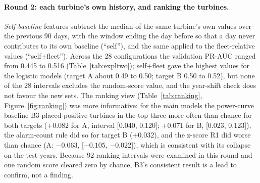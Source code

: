 \documentclass[12pt,a4paper]{article}
\begin{document}
	\begin{table}[htbp]
	\centering
	\footnotesize
	
	\caption{Round 1, validation PR-AUC. Raw: features as in the main models; Fleet: sensor features minus the same-day fleet median; Fleet+season: also minus the training-year month-of-year mean. Random-score value: 0.465 (A) and 0.483 (B).}
	\label{tab:explval}
	\end{table}

	\begin{table}[htbp]
	\centering
	\footnotesize
	
	\caption{Round 1, year-shift check on training years only: PR-AUC on 2020 for models fitted on days up to 2018. The prevalence of 2020 is 0.412 (A) and 0.399 (B).}
	\label{tab:explshift}
	\end{table}

	\paragraph{Round 2: each turbine's own history, and ranking the turbines.} \emph{Self-baseline} features subtract the median of the same turbine's own values over the previous 90 days, with the window ending the day before so that a day never contributes to its own baseline (``self''), and the same applied to the fleet-relative values (``self+fleet''). Across the 28 configurations the validation PR-AUC ranged from 0.445 to 0.516 (Table~\ref{tab:expltwo}); self+fleet gave the highest values for the logistic models (target A about 0.49 to 0.50; target B 0.50 to 0.52), but none of the 28 intervals excludes the random-score value, and the year-shift check does not favour the new sets. The ranking view (Table~\ref{tab:ranking}, Figure~\ref{fig:ranking}) was more informative: for the main models the power-curve baseline B3 placed positive turbines in the top three more often than chance for both targets ($+0.082$ for A, interval [0.040, 0.120]; $+0.071$ for B, [0.023, 0.123]), the alarm-count rule did so for target B ($+0.032$), and the z-score R1 did worse than chance (A: $-0.063$, [$-0.105$, $-0.022$]), which is consistent with its collapse on the test years. Because 92 ranking intervals were examined in this round and one random score cleared zero by chance, B3's consistent result is a lead to confirm, not a finding.

	\begin{table}[htbp]
	\centering
	\footnotesize
	
	\caption{Round 2, validation PR-AUC. Raw: features as in the main models; Self: sensor features minus the turbine's own median of the previous 90 days; Self+fleet: the same on fleet-relative features. Random-score value: 0.465 (A) and 0.483 (B).}
	\label{tab:expltwo}
	\end{table}
\end{document}
